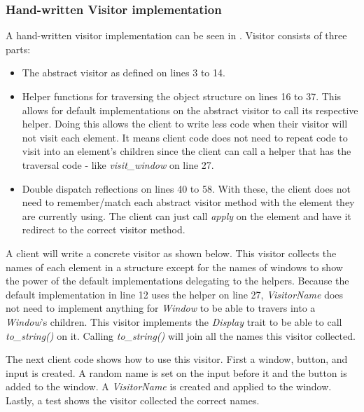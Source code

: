 
\subsubsection{Hand-written Visitor implementation}
A hand-written visitor implementation can be seen in .
Visitor consists of three parts:
\begin{itemize}
	\item The abstract visitor as defined on lines 3 to 14.
	\item Helper functions for traversing the object structure \cite{gamma_94_01} on lines 16 to 37.
	      This allows for default implementations on the abstract visitor to call its respective helper.
	      Doing this allows the client to write less code when their visitor will not visit each element.
	      It means client code does not need to repeat code to visit into an element's children since the client can call a helper that has the traversal code - like \textit{visit\_window} on line 27.
	\item Double dispatch reflections on lines 40 to 58.
	      With these, the client does not need to remember/match each abstract visitor method with the element they are currently using.
	      The client can just call \textit{apply} on the element and have it redirect to the correct visitor method.
\end{itemize}


A client will write a concrete visitor as shown below.
This visitor collects the names of each element in a structure except for the names of windows to show the power of the default implementations delegating to the helpers.
Because the default implementation in  line 12 uses the helper on line 27, \textit{VisitorName} does not need to implement anything for \textit{Window} to be able to travers into a \textit{Window}'s children.
This visitor implements the \textit{Display} trait to be able to call \textit{to\_string()} on it.
Calling \textit{to\_string()} will join all the names this visitor collected.


The next client code shows how to use this visitor.
First a window, button, and input is created.
A random name is set on the input before it and the button is added to the window.
A \textit{VisitorName} is created and applied to the window.
Lastly, a test shows the visitor collected the correct names.

